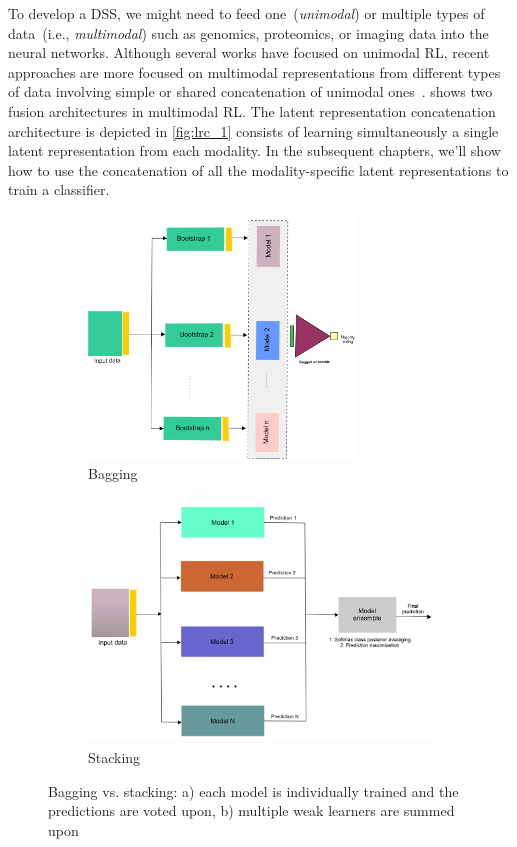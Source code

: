 \hspace*{3.5mm} To develop a DSS, we might need to feed one~(\textit{unimodal}) or multiple types of data~(i.e., \textit{multimodal}) such as genomics, proteomics, or imaging data into the neural networks. Although several works have focused on unimodal RL, recent approaches are more focused on multimodal representations from different types of data involving simple or shared concatenation of unimodal ones~\cite{mmsurvey}.  shows two fusion architectures in multimodal RL. The latent representation concatenation architecture is depicted in \cref{fig:lrc_1} consists of learning simultaneously a single latent representation from each modality. In the subsequent chapters, we'll show how to use the concatenation of all the modality-specific latent representations to train a classifier. 

\begin{figure}[htp!]
	\centering
	\begin{subfigure}{.48\linewidth}
		\centering
		\includegraphics[width=\linewidth,height=65mm]{images/bagging.png}
		\caption{Bagging}
        \label{fig:bagging}
	\end{subfigure}
	\hspace{2mm}
	\begin{subfigure}{0.48\linewidth}
		\centering
		\includegraphics[width=\linewidth,height=65mm]{images/stacking.png}
		\caption{Stacking}
        \label{fig:stacking}
	\end{subfigure}
	\caption{Bagging vs. stacking: a) each model is individually trained and the predictions are voted upon, b) multiple weak learners are summed upon} 
	\label{fig:bagging_and_stacking}
	\vspace{-2mm}
\end{figure}

